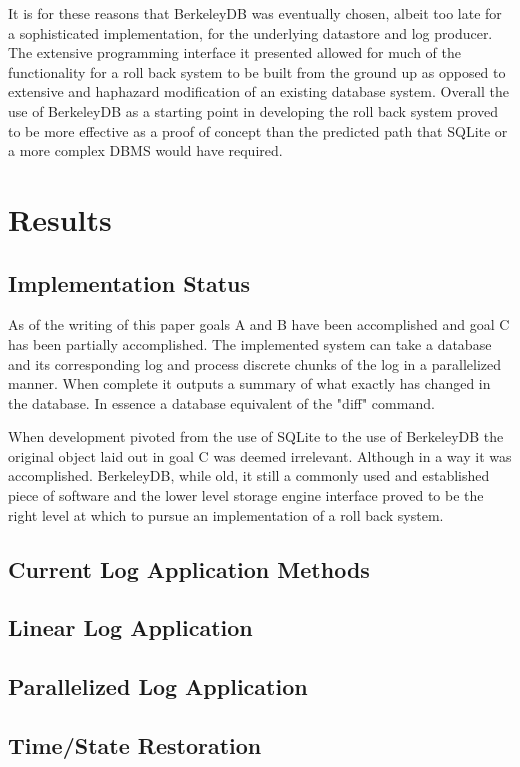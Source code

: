 \documentclass{article}
\begin{document}
It is for these reasons that BerkeleyDB was eventually chosen, albeit too late for a sophisticated implementation, for the underlying datastore and log producer. The extensive programming interface it presented allowed for much of the functionality for a roll back system to be built from the ground up as opposed to extensive and haphazard modification of an existing database system. Overall the use of BerkeleyDB as a starting point in developing the roll back system proved to be more effective as a proof of concept than the predicted path that SQLite or a more complex DBMS would have required. 

\section{Results}
\subsection{Implementation Status}

As of the writing of this paper goals A and B have been accomplished and goal C has been partially accomplished. The implemented system can take a database and its corresponding log and process discrete chunks of the log in a parallelized manner. When complete it outputs a summary of what exactly has changed in the database. In essence a database equivalent of the "diff" command. 

When development pivoted from the use of SQLite to the use of BerkeleyDB the original object laid out in goal C was deemed irrelevant. Although in a way it was accomplished. BerkeleyDB, while old, it still a commonly used and established piece of software and the lower level storage engine interface proved to be the right level at which to pursue an implementation of a roll back system.

\subsection{Current Log Application Methods}

\subsection{Linear Log Application}
\subsection{Parallelized Log Application}
\subsection{Time/State Restoration}
\end{document}

